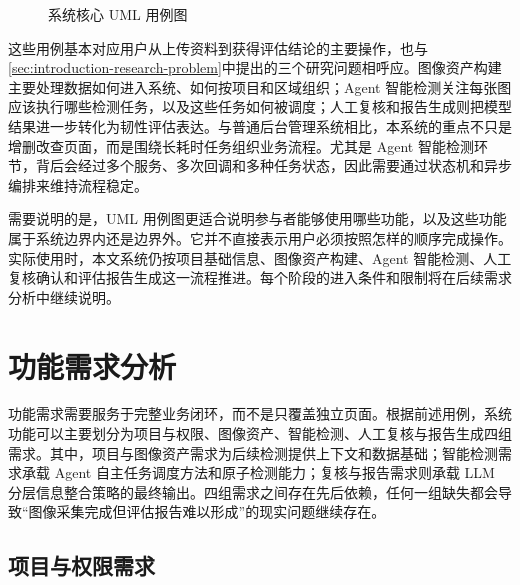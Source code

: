 \begin{figure}[!htb]
  \caption{系统核心 UML 用例图}\label{fig:requirements-core-use-case}
\end{figure}

这些用例基本对应用户从上传资料到获得评估结论的主要操作，也与\cref{sec:introduction-research-problem}中提出的三个研究问题相呼应。图像资产构建主要处理数据如何进入系统、如何按项目和区域组织；Agent 智能检测关注每张图应该执行哪些检测任务，以及这些任务如何被调度；人工复核和报告生成则把模型结果进一步转化为韧性评估表达。与普通后台管理系统相比，本系统的重点不只是增删改查页面，而是围绕长耗时任务组织业务流程。尤其是 Agent 智能检测环节，背后会经过多个服务、多次回调和多种任务状态，因此需要通过状态机和异步编排来维持流程稳定。

需要说明的是，UML 用例图更适合说明参与者能够使用哪些功能，以及这些功能属于系统边界内还是边界外。它并不直接表示用户必须按照怎样的顺序完成操作。实际使用时，本文系统仍按项目基础信息、图像资产构建、Agent 智能检测、人工复核确认和评估报告生成这一流程推进。每个阶段的进入条件和限制将在后续需求分析中继续说明。

\section{功能需求分析}
\label{sec:requirements-functional-requirement-analysis}

功能需求需要服务于完整业务闭环，而不是只覆盖独立页面。根据前述用例，系统功能可以主要划分为项目与权限、图像资产、智能检测、人工复核与报告生成四组需求。其中，项目与图像资产需求为后续检测提供上下文和数据基础；智能检测需求承载 Agent 自主任务调度方法和原子检测能力；复核与报告需求则承载 LLM 分层信息整合策略的最终输出。四组需求之间存在先后依赖，任何一组缺失都会导致“图像采集完成但评估报告难以形成”的现实问题继续存在。

\subsection{项目与权限需求}
\label{subsec:requirements-project-and-permission-requirement}

